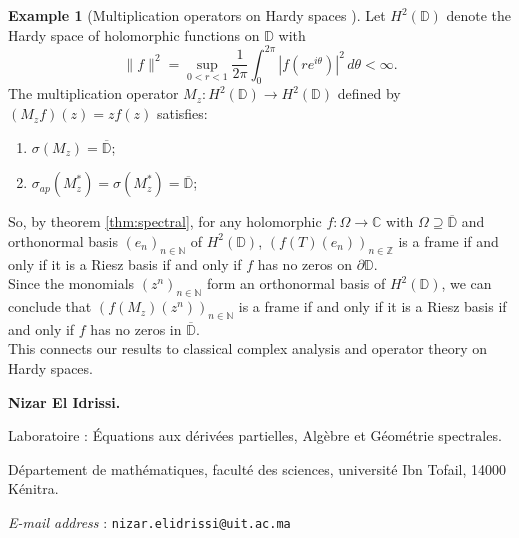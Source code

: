 \documentclass[a4paper,11pt]{article}
\makeatletter
\theoremstyle{plain}
\theoremstyle{definition}
\newtheorem{example}[theorem]{Example}
\theoremstyle{remark}
\newcommand{\Addresses}{{%
  \bigskip
  \footnotesize
  \textbf{Nizar El Idrissi.}
  \par\nopagebreak Laboratoire : Équations aux dérivées partielles, Algèbre et Géométrie spectrales.
  \par\nopagebreak
  Département de mathématiques, faculté des sciences, université Ibn Tofail, 14000 Kénitra.\par\nopagebreak 
  \textit{E-mail address} : \texttt{nizar.elidrissi@uit.ac.ma}
}}
\makeatother
\begin{document}
\begin{example}[Multiplication operators on Hardy spaces \cite{GarciaMashreghiRoss2016}]
\label{ExHardySpace}
Let $H^2(\mathbb{D})$ denote the Hardy space of holomorphic functions on $\mathbb{D}$ with
\[\|f\|^2 = \sup_{0 < r < 1} \frac{1}{2\pi} \int_0^{2\pi} |f(re^{i\theta})|^2 \, d\theta < \infty.\]
The multiplication operator $M_z: H^2(\mathbb{D}) \to H^2(\mathbb{D})$ defined by $(M_z f)(z) = zf(z)$ satisfies:
\begin{enumerate}[label=(\roman*)]
\item $\sigma(M_z) = \overline{\mathbb{D}}$;
\item $\sigma_{ap}(M_z^*) = \sigma(M_z^*) = \overline{\mathbb{D}}$;
\end{enumerate}
So, by theorem \ref{thm:spectral}, for any holomorphic $f: \Omega \to \mathbb{C}$ with $\Omega \supseteq \overline{\mathbb{D}}$ and orthonormal basis $(e_n)_{n \in \mathbb{N}}$ of $H^2(\mathbb{D})$, $(f(T)(e_n))_{n \in \mathbb{Z}}$ is a frame if and only if it is a Riesz basis if and only if $f$ has no zeros on $\partial \mathbb{D}$. \\
Since the monomials $(z^n)_{n \in \mathbb{N}}$ form an orthonormal basis of $H^2(\mathbb{D})$, we can conclude that $(f(M_z)(z^n))_{n \in \mathbb{N}}$ is a frame if and only if it is a Riesz basis if and only if $f$ has no zeros in $\overline{\mathbb{D}}$. \\
This connects our results to classical complex analysis and operator theory on Hardy spaces.
\end{example}


%

\nocite{*}



\Addresses
\end{document}
